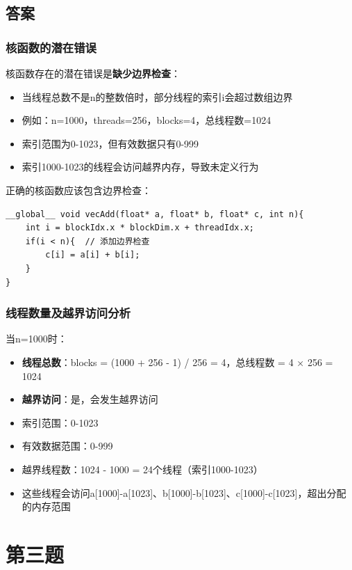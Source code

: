 \section{答案}
\subsection{核函数的潜在错误}

核函数存在的潜在错误是\textbf{缺少边界检查}：

\begin{itemize}
    \item 当线程总数不是n的整数倍时，部分线程的索引i会超过数组边界
    \item 例如：n=1000，threads=256，blocks=4，总线程数=1024
    \item 索引范围为0-1023，但有效数据只有0-999
    \item 索引1000-1023的线程会访问越界内存，导致未定义行为
\end{itemize}

正确的核函数应该包含边界检查：
\begin{lstlisting}[style=cleancpp]
__global__ void vecAdd(float* a, float* b, float* c, int n){
    int i = blockIdx.x * blockDim.x + threadIdx.x;
    if(i < n){  // 添加边界检查
        c[i] = a[i] + b[i];
    }
}
\end{lstlisting}

\subsection{线程数量及越界访问分析}

当n=1000时：
\begin{itemize}
    \item \textbf{线程总数}：blocks = (1000 + 256 - 1) / 256 = 4，总线程数 = 4 × 256 = 1024
    \item \textbf{越界访问}：是，会发生越界访问
    \item 索引范围：0-1023
    \item 有效数据范围：0-999
    \item 越界线程数：1024 - 1000 = 24个线程（索引1000-1023）
    \item 这些线程会访问a[1000]-a[1023]、b[1000]-b[1023]、c[1000]-c[1023]，超出分配的内存范围
\end{itemize}

\chapter{第三题}

